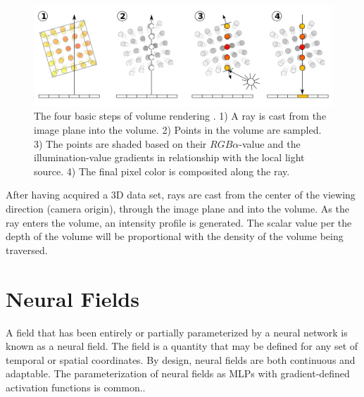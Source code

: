 \begin{figure}[h]
    \centering
    \includegraphics[width=1.0\textwidth]{figures/VolumeRenderingRayCasting.png}
    \caption{The four basic steps of volume rendering \cite{wiki:Volume_ray_casting}. 1) A ray is cast from the image plane into the volume. 2) Points in the volume are sampled. 3) The points are shaded based on their $RGB\alpha$-value and the illumination-value gradients in relationship with the local light source. 4) The final pixel color is composited along the ray.}
    \label{fig:volumerendering}
\end{figure}


After having acquired a 3D data set, rays are cast from the center of the viewing direction (camera origin), through the image plane and into the volume. As the ray enters the volume, an intensity profile is generated. The scalar value per the depth of the volume will be proportional with the density of the volume being traversed.

\section{Neural Fields} %
A field that has been entirely or partially parameterized by a neural network is known as a neural field. The field is a quantity that may be defined for any set of temporal or spatial coordinates. By design, neural fields are both continuous and adaptable. The parameterization of neural fields as MLPs with gradient-defined activation functions is common.\cite{xie_neural_2022}.

